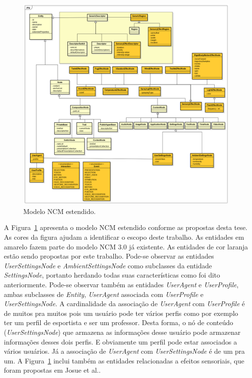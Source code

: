 \begin{figure}
    \centering
    \includegraphics[scale=0.35,keepaspectratio=true]{figuras/NCM.png}
    \caption{Modelo NCM estendido.}
    \label{fig:NCMExt}
\end{figure}

A Figura~\ref{fig:NCMExt}  apresenta o modelo NCM estendido conforme as propostas desta tese. As cores da figura ajudam a identificar o escopo deste trabalho. As entidades em amarelo fazem parte do modelo NCM 3.0 já existente. As entidades de cor laranja estão sendo propostas por este trabalho. Pode-se observar as entidades \textit{UserSettingsNode} e \textit{AmbientSettingsNode} como subclasses da entidade \textit{SettingsNode}, portanto herdando todas suas características como foi dito anteriormente. Pode-se observar também as entidades \textit{UserAgent} e \textit{UserProfile}, ambas subclasses de \textit{Entity}, \textit{UserAgent} associada com \textit{UserProfile} e \textit{UserSettingsNode}. A cardinalidade da associação de \textit{UserAgent} com \textit{UserProfile} é de muitos pra muitos pois um usuário pode ter vários perfis como por exemplo ter um perfil de esportista e ser um professor. Desta forma, o nó de conteúdo (\textit{UserSettingsNode}) que armazena as informações desse usuário pode armazenar informações desses dois perfis. E obviamente um perfil pode estar associados a vários usuários. Já a associação de \textit{UserAgent} com \textit{UserSettingsNode} é de um pra um. A Figura~\ref{fig:NCMExt} inclui também as entidades relacionadas a efeitos sensoriais, que foram propostas em Josue et al.\cite{Josue:2018:MSE:3204949.3204967}.

